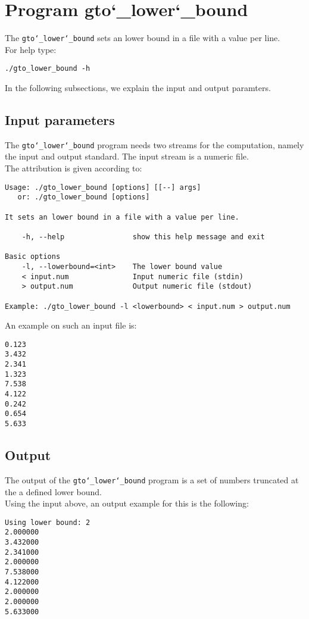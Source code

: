 \section{Program gto\char`_lower\char`_bound}
The \texttt{gto\char`_lower\char`_bound} sets an lower bound in a file with a value per line.\\
For help type:
\begin{lstlisting}
./gto_lower_bound -h
\end{lstlisting}
In the following subsections, we explain the input and output paramters.

\subsection*{Input parameters}

The \texttt{gto\char`_lower\char`_bound} program needs two streams for the computation, namely the input and output standard. The input stream is a numeric file.\\
The attribution is given according to:
\begin{lstlisting}
Usage: ./gto_lower_bound [options] [[--] args]
   or: ./gto_lower_bound [options]

It sets an lower bound in a file with a value per line.

    -h, --help                show this help message and exit

Basic options
    -l, --lowerbound=<int>    The lower bound value
    < input.num               Input numeric file (stdin)
    > output.num              Output numeric file (stdout)

Example: ./gto_lower_bound -l <lowerbound> < input.num > output.num
\end{lstlisting}
An example on such an input file is:
\begin{lstlisting}
0.123
3.432
2.341
1.323
7.538
4.122
0.242
0.654
5.633
\end{lstlisting}

\subsection*{Output}
The output of the \texttt{gto\char`_lower\char`_bound} program is a set of numbers truncated at the a defined lower bound.\\
Using the input above, an output example for this is the following:
\begin{lstlisting}
Using lower bound: 2
2.000000
3.432000
2.341000
2.000000
7.538000
4.122000
2.000000
2.000000
5.633000
\end{lstlisting}